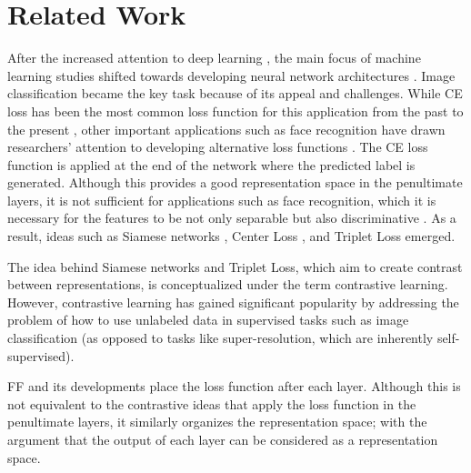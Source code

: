 \section{Related Work}
\label{sec:related}
After the increased attention to deep learning \cite{krizhevsky2012imagenet}, the main focus of machine learning studies shifted towards developing neural network architectures \cite{simonyan2014very, he2016deep, hu2018squeeze, pmlr-v97-tan19a}. Image classification became the key task because of its appeal and challenges. While CE loss has been the most common loss function for this application from the past \cite{lecun1998gradient} to the present \cite{woo2023convnext}, other important applications such as face recognition have drawn researchers' attention to developing alternative loss functions \cite{koch2015siamese, wen2016discriminative, schroff2015facenet, liu2016large}. The CE loss function is applied at the end of the network where the predicted label is generated. Although this provides a good representation space in the penultimate layers, it is not sufficient for applications such as face recognition, which it is necessary for the features to be not only separable but also discriminative \cite{wen2016discriminative}. As a result, ideas such as Siamese networks \cite{koch2015siamese, Bromley1993SignatureVU}, Center Loss \cite{wen2016discriminative}, and Triplet Loss \cite{schroff2015facenet} emerged. 

The idea behind Siamese networks and Triplet Loss, which aim to create contrast between representations, is conceptualized under the term contrastive learning. However, contrastive learning has gained significant popularity \cite{chen2020simple, khosla2020supervised, he2020momentum, chen2020improved, radford2021learning} by addressing the problem of how to use unlabeled data in supervised tasks such as image classification (as opposed to tasks like super-resolution, which are inherently self-supervised).

FF \cite{hinton2022forward} and its developments \cite{lee2023symba, lorberbom2024layer, zhu2022contrastive, ahamed2023ffcl, scodellaro2023training, papachristodoulou2024convolutional, aghagolzadeh2024marginal} place the loss function after each layer. Although this is not equivalent to the contrastive ideas that apply the loss function in the penultimate layers, it similarly organizes the representation space; with the argument that the output of each layer can be considered as a representation space.


